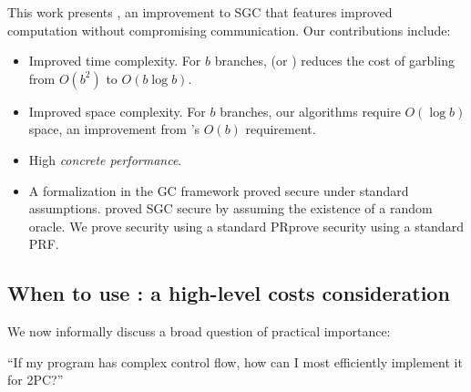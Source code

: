 \medskip
This work presents \ourschemelong, an improvement to SGC that features
improved computation without compromising communication.
Our contributions include:
\begin{itemize}
  \item Improved time complexity.
    For $b$ branches, \ourschemelong (or
    \ourscheme)  reduces the cost of garbling  from $O(b^2)$ to
    $O(b \log b)$.
  \item Improved space complexity.
    For $b$ branches, our algorithms require $O(\log b)$ space, an
    improvement from \HK's $O(b)$ requirement.
  \item High \emph{concrete performance}.
  \item
    A formalization in the \cite{CCS:BelHoaRog12} GC framework proved 
    secure under standard assumptions.
    \HK proved SGC secure by assuming the existence of a random oracle.
    We prove security using a standard PRprove security using a
    standard PRF.
\end{itemize}



\subsection{When to use \ourschemelong: a high-level costs consideration}
\label{sec:whentouse}

We now informally discuss a broad question of
practical importance:

\begin{displayquote}
  ``If my program has complex control flow, how can I most efficiently implement it for 2PC?''
\end{displayquote}

